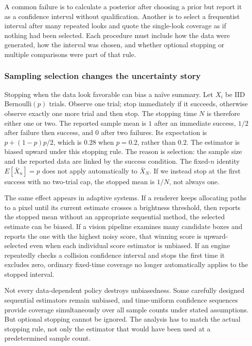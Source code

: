 A common failure is to calculate a posterior after choosing a prior but report it as a confidence interval without qualification. Another is to select a frequentist interval after many repeated looks and quote the single-look coverage as if nothing had been selected. Each procedure must include how the data were generated, how the interval was chosen, and whether optional stopping or multiple comparisons were part of that rule.

\subsubsection{Sampling selection changes the uncertainty story}\label{sampling-selection-changes-the-uncertainty-story}

Stopping when the data look favorable can bias a naïve summary. Let \(X_i\) be IID Bernoulli\((p)\) trials. Observe one trial; stop immediately if it succeeds, otherwise observe exactly one more trial and then stop. The stopping time \(N\) is therefore either one or two. The reported sample mean is \(1\) after an immediate success, \(1/2\) after failure then success, and \(0\) after two failures. Its expectation is \(p+(1-p)p/2\), which is \(0.28\) when \(p=0.2\), rather than \(0.2\). The estimator is biased upward under this stopping rule. The reason is selection: the sample size and the reported data are linked by the success condition. The fixed-\(n\) identity \(E[\bar X_n]=p\) does not apply automatically to \(\bar X_N\). If we instead stop at the first success with no two-trial cap, the stopped mean is \(1/N\), not always one.

The same effect appears in adaptive systems. If a renderer keeps allocating paths to a pixel until its current estimate crosses a brightness threshold, then reports the stopped mean without an appropriate sequential method, the selected estimate can be biased. If a vision pipeline examines many candidate boxes and reports the one with the highest noisy score, that winning score is upward-selected even when each individual score estimator is unbiased. If an engine repeatedly checks a collision confidence interval and stops the first time it excludes zero, ordinary fixed-time coverage no longer automatically applies to the stopped interval.

Not every data-dependent policy destroys unbiasedness. Some carefully designed sequential estimators remain unbiased, and time-uniform confidence sequences provide coverage simultaneously over all sample counts under stated assumptions. But optional stopping cannot be ignored. The analysis has to match the actual stopping rule, not only the estimator that would have been used at a predetermined sample count.

